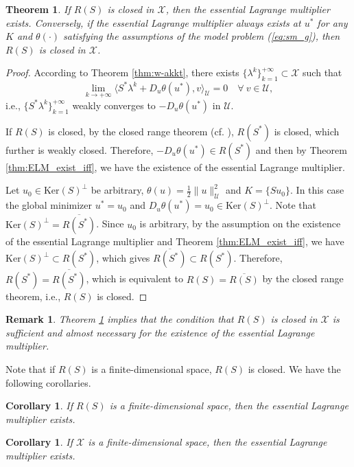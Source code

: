 \documentclass[leqno]{amsart}
\newtheorem{theorem}{Theorem}[section]
\newtheorem{Corollary}[Theorem]{Corollary}
\newtheorem{Remark}[Theorem]{Remark}
\theoremstyle{definition}
\begin{document}
\begin{theorem}\label{thm:ELM_exist_aiff}
If $R(S)$ is closed in $\mathcal{X}$, then the essential Lagrange multiplier exists. Conversely,  if the essential Lagrange multiplier always exists at $u^*$  for any $K$ and $\theta(\cdot)$ satisfying the assumptions of the model problem (\ref{eq:sm_g}), then $R(S)$ is closed in $\mathcal{X}$. 
\end{theorem}
\begin{proof}
According to Theorem \ref{thm:w-akkt}, there exists $\{\lambda^k\}_{k=1}^{+\infty}\subset \mathcal{X}$ such that
$$ \lim\limits_{k\rightarrow +\infty}\langle S^*\lambda^k + D_u\theta(u^*), v \rangle_\mathcal{U} = 0\quad \forall\ v\in \mathcal{U},$$
i.e., $\{S^*\lambda^k\}_{k=1}^{+\infty}$ weakly converges to $-D_u\theta(u^*)$ in $\mathcal{U}$. 

If $R(S)$ is closed, by the closed range theorem (cf. \cite[p. 205]{yosida2012functional}), $R(S^*)$ is closed, which further is weakly closed. Therefore, $-D_u\theta(u^*)\in R(S^*)$ and then by Theorem \ref{thm:ELM_exist_iff}, we have the existence of the essential Lagrange multiplier.

Let $u_0\in \mathrm{Ker}(S)^\perp$ be arbitrary, $\theta(u) =  \frac{1}{2}\|u\|_{\mathcal{U}}^2$ and  $ K = \{Su_0\}$. In this case the global minimizer $u^* = u_0$ and $D_u\theta(u^*) = u_0\in \mathrm{Ker}(S)^\perp$. Note that $\mathrm{Ker}(S)^\perp=\overline{R(S^*)}$. Since $u_0$ is arbitrary, by the assumption on the existence of the essential Lagrange multiplier and Theorem  \ref{thm:ELM_exist_iff}, we have $\mathrm{Ker}(S)^\perp\subset R(S^*)$, which gives $\overline{R(S^*)} \subset R(S^*)$. Therefore, $R(S^*) = \overline{R(S^*)}$, which is equivalent to $R(S) = \overline{R(S)}$ by the closed range theorem, i.e., $R(S)$ is closed. 
\end{proof}

\begin{Remark}
Theorem \ref{thm:ELM_exist_aiff} implies that the condition that $R(S)$ is closed in $\mathcal{X}$ is sufficient and almost necessary for the existence of the essential Lagrange multiplier.
\end{Remark}

Note that if $R(S)$ is a finite-dimensional space, $R(S)$ is closed. We have the following corollaries.
\begin{Corollary}\label{cor:finite}
If $R(S)$ is a finite-dimensional space, then the essential Lagrange multiplier exists.
\end{Corollary}
\begin{Corollary}\label{cor:finite-d}
If $\mathcal{X}$ is a finite-dimensional space, then the essential Lagrange multiplier exists.
\end{Corollary}
\end{document}
